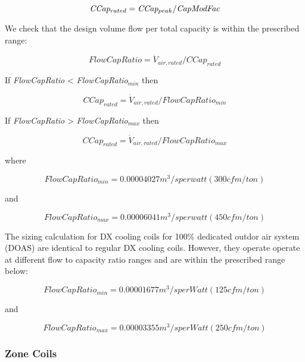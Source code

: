 \begin{equation}
\emph{CCap\(_{rated}\)} = \emph{CCap\(_{peak}\)}/ \emph{CapModFac}
\end{equation}

We check that the design volume flow per total capacity is within the prescribed range:

\begin{equation}
FlowCapRatio = \dot V_{air,rated}/CCap_{rated}
\end{equation}

If \emph{FlowCapRatio} \textless{} \emph{FlowCapRatio\(_{min}\)} then

\begin{equation}
CCap_{rated} = \dot V_{air,rated}/FlowCapRatio_{min}
\end{equation}

If \emph{FlowCapRatio} \textgreater{} \emph{FlowCapRatio\(_{max}\)} then

\begin{equation}
CCap_{rated} = \dot V_{air,rated}/FlowCapRatio_{max}
\end{equation}

where

\begin{equation}
FlowCapRatio_{min} = 0.00004027 m^{3}/s per watt (300 cfm/ton)
\end{equation}

and

\begin{equation}
FlowCapRatio_{max} = 0.00006041 m^{3}/s per watt (450 cfm/ton)
\end{equation}

The sizing calculation for DX cooling coils for 100\% dedicated outdor air system (DOAS) are identical to regular DX cooling coils. However, they operate operate at different flow to capacity ratio ranges and are within the prescribed range below:

\begin{equation}
FlowCapRatio_{min} = 0.00001677 m^{3}/s per Watt (125 cfm/ton)
\end{equation}

and

\begin{equation}
FlowCapRatio_{max} = 0.00003355 m^{3}/s per Watt (250 cfm/ton)
\end{equation}

\subsubsection{Zone Coils}\label{zone-coils-5}

